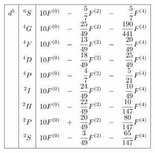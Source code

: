\begin{table}
\begin{minipage}{0.5\textwidth}
\begin{equation*}
\renewcommand{\arraystretch}{1.8}
\begin{array}{|>{\displaystyle}c|>{\displaystyle}c|>{\displaystyle}r >{\displaystyle}c >{\displaystyle}r >{\displaystyle}c >{\displaystyle}r|}
\hline
d^5 & ^6S & 10 F^{(0)} & - & \frac{5}{7} F^{(2)} & - & \frac{5}{7} F^{(4)} \\
    & ^4G & 10 F^{(0)} & - & \frac{25}{49} F^{(2)} & - & \frac{190}{441} F^{(4)} \\
    & ^4F & 10 F^{(0)} & - & \frac{13}{49} F^{(2)} & - & \frac{20}{49} F^{(4)} \\
    & ^4D & 10 F^{(0)} & - & \frac{18}{49} F^{(2)} & - & \frac{25}{49} F^{(4)} \\
    & ^4P & 10 F^{(0)} & - & \frac{4}{7} F^{(2)} & - & \frac{5}{21} F^{(4)} \\
    & ^2I & 10 F^{(0)} & - & \frac{24}{49} F^{(2)} & - & \frac{10}{49} F^{(4)} \\
    & ^2H & 10 F^{(0)} & - & \frac{22}{49} F^{(2)} & - & \frac{10}{147} F^{(4)} \\
    & ^2P & 10 F^{(0)} & + & \frac{20}{49} F^{(2)} & - & \frac{80}{147} F^{(4)} \\
    & ^2S & 10 F^{(0)} & - & \frac{3}{49} F^{(2)} & - & \frac{65}{147} F^{(4)} \\[0.5em]
\hline
\end{array}
\end{equation*}
\end{minipage}


\end{table}
